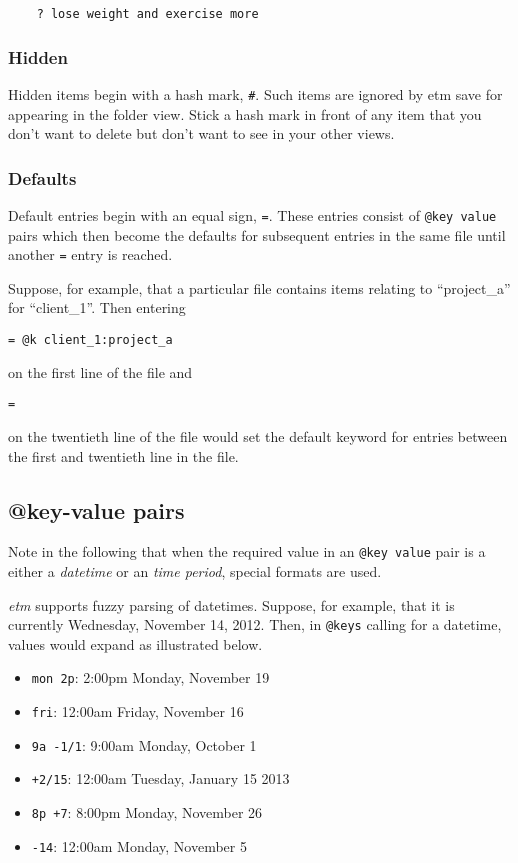\documentclass[]{article}
\begin{document}
\begin{verbatim}
    ? lose weight and exercise more
\end{verbatim}

\subsubsection{Hidden}

Hidden items begin with a hash mark, \texttt{\#}. Such items are ignored
by etm save for appearing in the folder view. Stick a hash mark in front
of any item that you don't want to delete but don't want to see in your
other views.

\subsubsection{Defaults}

Default entries begin with an equal sign, \texttt{=}. These entries
consist of \texttt{@key value} pairs which then become the defaults for
subsequent entries in the same file until another \texttt{=} entry is
reached.

Suppose, for example, that a particular file contains items relating to
``project\_a'' for ``client\_1''. Then entering

\begin{verbatim}
= @k client_1:project_a
\end{verbatim}

on the first line of the file and

\begin{verbatim}
=
\end{verbatim}

on the twentieth line of the file would set the default keyword for
entries between the first and twentieth line in the file.

\subsection{@key-value pairs}

Note in the following that when the required value in an
\texttt{@key value} pair is a either a \emph{datetime} or an \emph{time
period}, special formats are used.

\emph{etm} supports fuzzy parsing of datetimes. Suppose, for example,
that it is currently Wednesday, November 14, 2012. Then, in
\texttt{@keys} calling for a datetime, values would expand as
illustrated below.

\begin{itemize}
\item
  \texttt{mon 2p}: 2:00pm Monday, November 19
\item
  \texttt{fri}: 12:00am Friday, November 16
\item
  \texttt{9a -1/1}: 9:00am Monday, October 1
\item
  \texttt{+2/15}: 12:00am Tuesday, January 15 2013
\item
  \texttt{8p +7}: 8:00pm Monday, November 26
\item
  \texttt{-14}: 12:00am Monday, November 5
\end{itemize}
\end{document}
